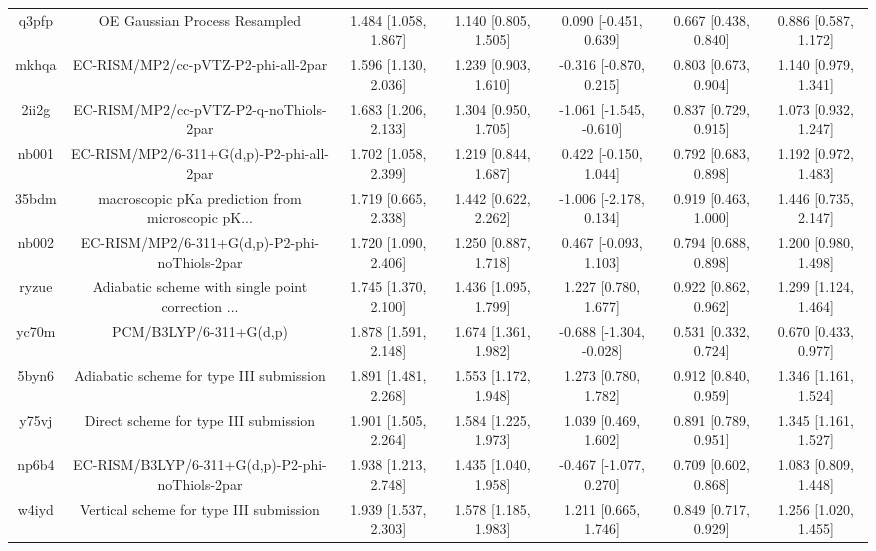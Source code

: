\documentclass{article}
\begin{document}
\begin{center}
\begin{longtable}{|ccccccc|}
 q3pfp &                      OE Gaussian Process Resampled &  1.484 [1.058, 1.867] &  1.140 [0.805, 1.505] &    0.090 [-0.451, 0.639] &  0.667 [0.438, 0.840] &   0.886 [0.587, 1.172] \\
 mkhqa &                EC-RISM/MP2/cc-pVTZ-P2-phi-all-2par &  1.596 [1.130, 2.036] &  1.239 [0.903, 1.610] &   -0.316 [-0.870, 0.215] &  0.803 [0.673, 0.904] &   1.140 [0.979, 1.341] \\
 2ii2g &             EC-RISM/MP2/cc-pVTZ-P2-q-noThiols-2par &  1.683 [1.206, 2.133] &  1.304 [0.950, 1.705] &  -1.061 [-1.545, -0.610] &  0.837 [0.729, 0.915] &   1.073 [0.932, 1.247] \\
 nb001 &           EC-RISM/MP2/6-311+G(d,p)-P2-phi-all-2par &  1.702 [1.058, 2.399] &  1.219 [0.844, 1.687] &    0.422 [-0.150, 1.044] &  0.792 [0.683, 0.898] &   1.192 [0.972, 1.483] \\
 35bdm &  macroscopic pKa prediction from microscopic pK... &  1.719 [0.665, 2.338] &  1.442 [0.622, 2.262] &   -1.006 [-2.178, 0.134] &  0.919 [0.463, 1.000] &   1.446 [0.735, 2.147] \\
 nb002 &      EC-RISM/MP2/6-311+G(d,p)-P2-phi-noThiols-2par &  1.720 [1.090, 2.406] &  1.250 [0.887, 1.718] &    0.467 [-0.093, 1.103] &  0.794 [0.688, 0.898] &   1.200 [0.980, 1.498] \\
 ryzue &  Adiabatic scheme with single point correction ... &  1.745 [1.370, 2.100] &  1.436 [1.095, 1.799] &     1.227 [0.780, 1.677] &  0.922 [0.862, 0.962] &   1.299 [1.124, 1.464] \\
 yc70m &                             PCM/B3LYP/6-311+G(d,p) &  1.878 [1.591, 2.148] &  1.674 [1.361, 1.982] &  -0.688 [-1.304, -0.028] &  0.531 [0.332, 0.724] &   0.670 [0.433, 0.977] \\
 5byn6 &           Adiabatic scheme for type III submission &  1.891 [1.481, 2.268] &  1.553 [1.172, 1.948] &     1.273 [0.780, 1.782] &  0.912 [0.840, 0.959] &   1.346 [1.161, 1.524] \\
 y75vj &              Direct scheme for type III submission &  1.901 [1.505, 2.264] &  1.584 [1.225, 1.973] &     1.039 [0.469, 1.602] &  0.891 [0.789, 0.951] &   1.345 [1.161, 1.527] \\
 np6b4 &    EC-RISM/B3LYP/6-311+G(d,p)-P2-phi-noThiols-2par &  1.938 [1.213, 2.748] &  1.435 [1.040, 1.958] &   -0.467 [-1.077, 0.270] &  0.709 [0.602, 0.868] &   1.083 [0.809, 1.448] \\
 w4iyd &            Vertical scheme for type III submission &  1.939 [1.537, 2.303] &  1.578 [1.185, 1.983] &     1.211 [0.665, 1.746] &  0.849 [0.717, 0.929] &   1.256 [1.020, 1.455] \\

\end{longtable}
\end{center}
\end{document}
